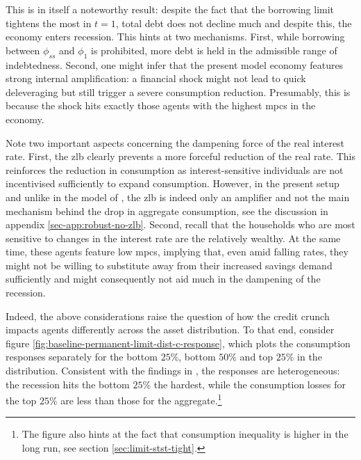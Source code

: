\documentclass[a4paper,12pt]{article} %
\numberwithin{equation}{section} %
\numberwithin{figure}{section}
\numberwithin{table}{section}
\begin{document}
This is in itself a noteworthy result: despite the fact that the borrowing limit tightens the most in $t=1$, total debt does not decline much and despite this, the economy enters recession. This hints at two mechanisms. First, while borrowing between $\phi_{ss}$ and $\phi_1$ is prohibited, more debt is held in the admissible range of indebtedness. Second, one might infer that the present model economy features strong internal amplification: a financial shock might not lead to quick deleveraging but still trigger a severe consumption reduction. Presumably, this is because the shock hits exactly those agents with the highest \Gls{mpc}s in the economy. %

Note two important aspects concerning the dampening force of the real interest rate. First, the \Gls{zlb} clearly prevents a more forceful reduction of the real rate. This reinforces the reduction in consumption as interest-sensitive individuals are not incentivised sufficiently to expand consumption. However, in the present setup and unlike in the model of \textcite{egg2012}, the \Gls{zlb} is indeed only an amplifier and not the main mechanism behind the drop in aggregate consumption, see the discussion in appendix \ref{sec-app:robust-no-zlb}. Second, recall that the households who are most sensitive to changes in the interest rate are the relatively wealthy. At the same time, these agents feature low \Gls{mpc}s, implying that, even amid falling rates, they might not be willing to substitute away from their increased savings demand sufficiently and might consequently not aid much in the dampening of the recession. 

Indeed, the above considerations raise the question of how the credit crunch impacts agents differently across the asset distribution. To that end, consider figure \ref{fig:baseline-permanent-limit-dist-c-response}, which plots the consumption responses separately for the bottom $25\%$, bottom $50\%$ and top $25\%$ in the distribution. Consistent with the findings in \textcite{gl2017}, the responses are heterogeneous: the recession hits the bottom $25\%$ the hardest, while the consumption losses for the top $25\%$ are less than those for the aggregate.\footnote{The figure also hints at the fact that consumption inequality is higher in the long run, see section \ref{sec:limit-stst-tight}.} 
\end{document}
